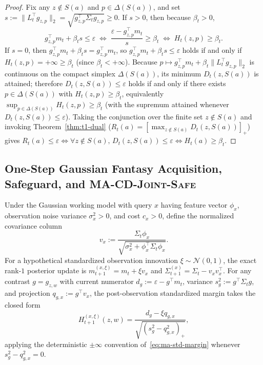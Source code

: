\documentclass{article}
\theoremstyle{plain}
\theoremstyle{definition}
\begin{document}
\begin{proof}
Fix any $z \notin S(a)$ and $p \in \Delta(S(a))$, and set $s := \|L_t^\top g_{z,p}\|_2 = \sqrt{g_{z,p}^\top \Sigma_t g_{z,p}} \ge 0$. If $s > 0$, then because $\beta_t > 0$,
\[
  g_{z,p}^\top m_t + \beta_t s \le \varepsilon
  \;\Longleftrightarrow\;
  \frac{\varepsilon - g_{z,p}^\top m_t}{s} \ge \beta_t
  \;\Longleftrightarrow\;
  H_t(z, p) \ge \beta_t.
\]
If $s = 0$, then $g_{z,p}^\top m_t + \beta_t s = g_{z,p}^\top m_t$, so $g_{z,p}^\top m_t + \beta_t s \le \varepsilon$ holds if and only if $H_t(z, p) = +\infty \ge \beta_t$ (since $\beta_t < +\infty$). Because $p \mapsto g_{z,p}^\top m_t + \beta_t \|L_t^\top g_{z,p}\|_2$ is continuous on the compact simplex $\Delta(S(a))$, its minimum $D_t(z, S(a))$ is attained; therefore $D_t(z, S(a)) \le \varepsilon$ holds if and only if there exists $p \in \Delta(S(a))$ with $H_t(z, p) \ge \beta_t$, equivalently $\sup_{p \in \Delta(S(a))} H_t(z, p) \ge \beta_t$ (with the supremum attained whenever $D_t(z, S(a)) \le \varepsilon$). Taking the conjunction over the finite set $z \notin S(a)$ and invoking Theorem~\ref{thm:t1-dual} ($R_t(a) = [\max_{z \notin S(a)} D_t(z, S(a))]_+$) gives $R_t(a) \le \varepsilon \iff \forall z \notin S(a),\, D_t(z, S(a)) \le \varepsilon \iff H_t(a) \ge \beta_t$.
\end{proof}

\subsection{One-Step Gaussian Fantasy Acquisition, Safeguard, and \textsc{MA-CD-Joint-Safe}}
\label{app:ma-algorithm}

Under the Gaussian working model with query $x$ having feature vector $\phi_x$, observation noise variance $\sigma_x^2 > 0$, and cost $c_x > 0$, define the normalized covariance column
\begin{equation}
  v_x := \frac{\Sigma_t \phi_x}{\sqrt{\sigma_x^2 + \phi_x^\top \Sigma_t \phi_x}}.
  \label{eq:ma-vx}
\end{equation}
For a hypothetical standardized observation innovation $\xi \sim \mathcal{N}(0, 1)$, the exact rank-$1$ posterior update is $m_{t+1}^{(x,\xi)} = m_t + \xi v_x$ and $\Sigma_{t+1}^{(x)} = \Sigma_t - v_x v_x^\top$. For any contrast $g = g_{z, w}$ with current numerator $d_g := \varepsilon - g^\top m_t$, variance $s_g^2 := g^\top \Sigma_t g$, and projection $q_{g,x} := g^\top v_x$, the post-observation standardized margin takes the closed form
\begin{equation}
  H_{t+1}^{(x,\xi)}(z, w)
  = \frac{d_g - \xi q_{g,x}}{\sqrt{(s_g^2 - q_{g,x}^2)_+}},
  \label{eq:ma-rank1}
\end{equation}
applying the deterministic $\pm\infty$ convention of~\eqref{eq:ma-std-margin} whenever $s_g^2 - q_{g,x}^2 = 0$.
\end{document}
